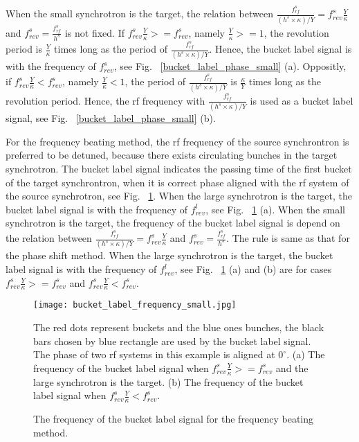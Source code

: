 When the small synchrotron is the target, the relation between $\frac{f_{\mathit{rf}}^{s}}{(h^s \times\kappa)/Y}=f_{\mathit{rev}}^{s}\frac{Y}{\kappa}$ and $f_{\mathit{rev}}^{s}=\frac{f_{\mathit{rf}}^{s}}{h^s}$ is not fixed. If $f_{\mathit{rev}}^{s}\frac{Y}{\kappa}>=f_{\mathit{rev}}^{s}$, namely $\frac{Y}{\kappa}>=1$, the revolution period is $\frac{Y}{\kappa}$ times long as the period of $\frac{f_{\mathit{rf}}^{s}}{(h^s \times \kappa)/Y}$. Hence, the bucket label signal is with the frequency of $f_{\mathit{rev}}^{s}$, see Fig. ~\ref{bucket_label_phase_small} (a). Oppositly,  if $f_{\mathit{rev}}^{s}\frac{Y}{\kappa}<f_{\mathit{rev}}^{s}$, namely $\frac{Y}{\kappa}<1$, the period of  $\frac{f_{\mathit{rf}}^{s}}{(h^s \times \kappa)/Y}$ is $\frac{\kappa}{Y}$ times long as the revolution period. Hence, the rf frequency with $\frac{f_{\mathit{rf}}^{s}}{(h^s \times \kappa)/Y}$ is used as a bucket label signal, see Fig. ~\ref{bucket_label_phase_small} (b). 


For the frequency beating method, the rf frequency of the source synchrontron is preferred to be detuned, because there exists circulating bunches in the target synchrotron. The bucket label signal indicates the passing time of the first bucket of the target synchrontron, when it is correct phase aligned with the rf system of the source synchrotron, see Fig. ~\ref{bucket_label_frequency_small}. When the large synchrotron is the target, the bucket label signal is with the frequency of $f_{\mathit{rev}}^{l}$, see Fig. ~\ref{bucket_label_frequency_small} (a). When the small synchrotron is the target, the frequency of the bucket label signal is depend on the relation between $\frac{f_{\mathit{rf}}^{s}}{(h^s \times\kappa)/Y}=f_{\mathit{rev}}^{s}\frac{Y}{\kappa}$ and $f_{\mathit{rev}}^{s}=\frac{f_{\mathit{rf}}^{s}}{h^s}$. The rule is same as that for the phase shift method. When the large synchrotron is the target, the bucket label signal is with the frequency of $f_{\mathit{rev}}^{l}$, see Fig. ~\ref{bucket_label_frequency_small} (a) and (b) are for cases $f_{\mathit{rev}}^{s}\frac{Y}{\kappa}>=f_{\mathit{rev}}^{s}$ and $f_{\mathit{rev}}^{s}\frac{Y}{\kappa}<f_{\mathit{rev}}^{s}$.

\begin{figure}[!htb]
   \centering   
   \texttt{[image: bucket\_label\_frequency\_small.jpg]}
   \caption{The frequency of the bucket label signal for the frequency beating method.}{The red dots represent buckets and the blue ones bunches, the black bars chosen by blue rectangle are used by the bucket label signal. The phase of two rf systems in this example is aligned at $0^\circ$. (a) The frequency of the bucket label signal when $f_{\mathit{rev}}^{s}\frac{Y}{\kappa}>=f_{\mathit{rev}}^{s}$ and the large synchrotron is the target. (b) The frequency of the bucket label signal when $f_{\mathit{rev}}^{s}\frac{Y}{\kappa}<f_{\mathit{rev}}^{s}$.}
   \label{bucket_label_frequency_small}
\end{figure}

